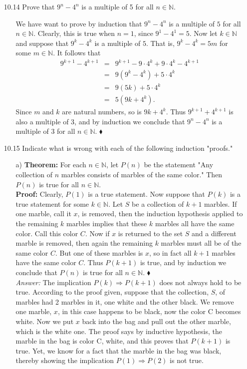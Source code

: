 \documentclass[12pt]{article}
\begin{document}
\begin{enumerate}
\item[10.14] Prove that $9^n - 4^n$ is a multiple of 5 for all $n \in \mathbb{N}$.
\begin{enumerate}
\item[] We have want to prove by induction that $9^n - 4^n$ is a multiple of $5$ for all
$n \in \mathbb{N}$. Clearly, this is true when $n = 1$, since $9^1 - 4^1 = 5$. Now let 
$k \in \mathbb{N}$ and suppose that $9^k - 4^k$ is a multiple of $5$. That is, 
$9^k - 4^k = 5m$ for some $m \in \mathbb{N}$. It follows that
\begin{eqnarray*}
9^{k + 1} - 4^{k + 1} &=&  9^{k + 1} - 9 \cdot 4^k + 9 \cdot 4^k - 4^{k + 1} \\
&=& 9(9^k - 4^k) + 5 \cdot 4^k \\
&=& 9(5k) + 5 \cdot 4^k \\
&=& 5(9k + 4^k).
\end{eqnarray*}
Since $m$ and $k$ are natural numbers, so is $9k + 4^k$. Thus $9^{k + 1} + 4^{k + 1}$ is
also a multiple of 3, and by induction we conclude that $9^n - 4^n$ is a multiple of
$3$ for all $n \in \mathbb{N}$. $\blacklozenge$
\end{enumerate}

\item[10.15] Indicate what is wrong with each of the following induction "proofs."
\begin{enumerate}
\item[a)] {\bf Theorem:} For each $n \in \mathbb{N}$, let $P(n)$ be the statement "Any collection of $n$ marbles consists of marbles of the same color." Then $P(n)$ is true for all $n \in \mathbb{N}$. \\
{\bf Proof:} Clearly, $P(1)$ is a true statement. Now suppose that $P(k)$ is a true statement for some $k \in \mathbb{N}$. Let $S$ be a collection of $k + 1$ marbles. If one marble, call it $x$, is removed, then the induction hypothesis applied to the remaining $k$ marbles implies that these $k$ marbles all have the same color. Call this color $C$. Now if $x$ is returned to the set $S$ and a different marble is removed, then again the remaining $k$ marbles must all be of the same color $C$. But one of these marbles is $x$, so in fact all $k + 1$ marbles have the same color $C$. Thus $P(k + 1)$ is true, and by induction we conclude that $P(n)$ is true for all $n \in \mathbb{N}$. $\blacklozenge$ \\
\emph{Answer:} The implication $P(k) \Rightarrow P(k + 1)$ does not always hold to be true. According to the proof given, suppose that the collection, $S$, of marbles had 2 marbles in it, one white and the other black. We remove one marble, $x$, in this case happens to be black, now
the color C becomes white. Now we put $x$ back into the bag and pull out the other marble, 
which is the white one. The proof says by inductive hypothesis, the marble in the bag is 
color C, white, and this proves that $P(k + 1)$ is true. Yet, we know for a fact that the
marble in the bag was black, thereby showing the implication $P(1) \Rightarrow P(2)$ is not true.
\end{enumerate}


\end{enumerate}
\end{document}
